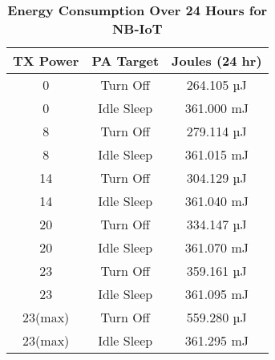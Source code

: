 \begin{table}[ht]
    \centering
    \small
    \begin{tabularx}{\columnwidth}{c c c}
    \toprule
    TX Power & PA Target & Joules (24 hr) \\
    \midrule
    0 & Turn Off & 264.105 µJ \\
    0 & Idle Sleep & 361.000 mJ \\
    8 & Turn Off & 279.114 µJ \\
    8 & Idle Sleep & 361.015 mJ \\
    14 & Turn Off & 304.129 µJ \\
    14 & Idle Sleep & 361.040 mJ \\
    20 & Turn Off & 334.147 µJ \\
    20 & Idle Sleep & 361.070 mJ \\
    23 & Turn Off & 359.161 µJ \\
    23 & Idle Sleep & 361.095 mJ \\
    23(max) & Turn Off & 559.280 µJ \\
23(max) & Idle Sleep & 361.295 mJ \\
    \bottomrule
    \end{tabularx}
    \caption{\textbf{Energy Consumption Over 24 Hours for NB-IoT}}
    \label{tab:nbiot_power}
\end{table}
    